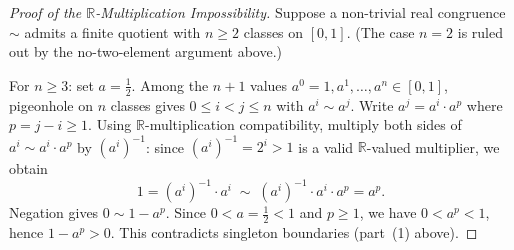 \documentclass[11pt,a4paper]{article}
\newcommand{\Real}{\mathbb{R}}
\begin{document}
\begin{proof}[Proof of the $\Real$-Multiplication Impossibility]
Suppose a non-trivial real congruence $\sim$ admits a finite quotient
with $n \geq 2$ classes on $[0,1]$.
(The case $n = 2$ is ruled out by the no-two-element argument above.)

For $n \geq 3$: set $a = \tfrac{1}{2}$.
Among the $n + 1$ values $a^0 = 1, a^1, \ldots, a^n \in [0,1]$,
pigeonhole on $n$ classes gives $0 \leq i < j \leq n$ with
$a^i \sim a^j$.
Write $a^j = a^i \cdot a^p$ where $p = j - i \geq 1$.
Using $\Real$-multiplication compatibility, multiply both sides
of $a^i \sim a^i \cdot a^p$ by $(a^i)^{-1}$:
since $(a^i)^{-1} = 2^i > 1$ is a valid $\Real$-valued
multiplier, we obtain
\[
1 = (a^i)^{-1} \cdot a^i \;\sim\; (a^i)^{-1} \cdot a^i \cdot a^p
= a^p.
\]
Negation gives $0 \sim 1 - a^p$.
Since $0 < a = \tfrac{1}{2} < 1$ and $p \geq 1$,
we have $0 < a^p < 1$, hence $1 - a^p > 0$.
This contradicts singleton boundaries (part~(1) above).
\end{proof}
\end{document}
